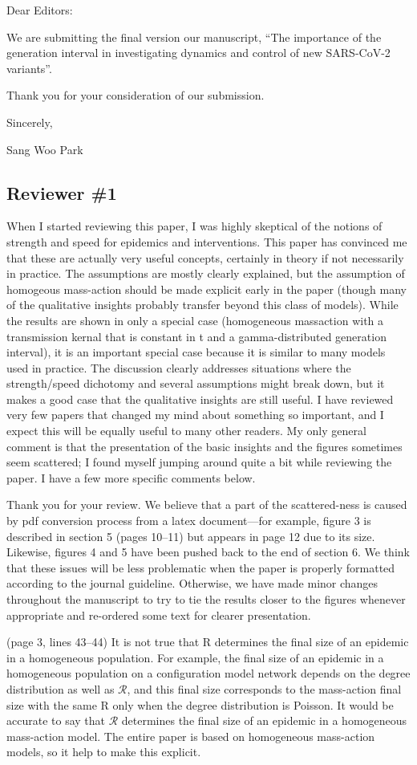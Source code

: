 \documentclass[12pt]{article}
\newcommand{\RR}{\ensuremath{{\mathcal R}}\xspace}
\newcommand{\rev}{\subsection*}
\newcommand{\revtext}{\textsf}
\begin{document}
\noindent Dear Editors:

We are submitting the final version our manuscript, “The importance of the generation interval in investigating dynamics and control of new SARS-CoV-2 variants”.

Thank you for your consideration of our submission.

Sincerely,

Sang Woo Park

\rev{Reviewer \#1}

\revtext{When I started reviewing this paper, I was highly skeptical of the notions of strength and speed for epidemics and interventions. This paper has convinced me that these are actually very useful concepts, certainly in theory if not necessarily in practice. The assumptions are mostly clearly explained, but the assumption of homogeous mass-action should be made explicit early in the paper (though many of the qualitative insights probably transfer beyond this class of models). While the results are shown in only a special case (homogeneous massaction with a transmission kernal that is constant in t and a gamma-distributed generation interval), it is an important special case because it is similar to many models used in practice. The discussion clearly addresses situations where the strength/speed dichotomy and several assumptions might break down, but it makes a good case that the qualitative insights are still useful. I have reviewed very few papers that changed my mind about something so important, and I expect this will be equally useful to many other readers. My only general comment is that the presentation of the basic insights and the figures sometimes seem scattered; I found myself jumping around quite a bit while reviewing the paper. I have a few more specific comments below.}

Thank you for your review. We believe that a part of the scattered-ness is caused by pdf conversion process from a latex document---for example, figure 3 is described in section 5 (pages 10--11) but appears in page 12 due to its size. Likewise, figures 4 and 5 have been pushed back to the end of section 6. We think that these issues will be less problematic when the paper is properly formatted according to the journal guideline. Otherwise, we have made minor changes throughout the manuscript to try to tie the results closer to the figures whenever appropriate and re-ordered some text for clearer presentation. 

\revtext{(page 3, lines 43–44) It is not true that R determines the final size of an epidemic in a homogeneous population. For example, the final size of an epidemic in a homogeneous population on a configuration model network depends on the degree distribution as well as $\RR$, and this final size corresponds to the mass-action final size with the same R only when the degree distribution is Poisson. It would be accurate to say that $\RR$ determines the final size of an epidemic in a homogeneous mass-action model. The entire paper is based on homogeneous mass-action models, so it help to make this explicit.}
\end{document}
